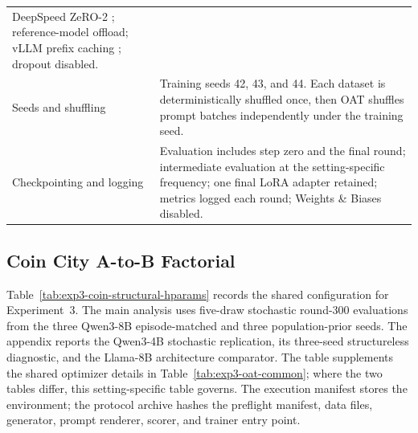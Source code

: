 \begin{center}
\begin{minipage}{\linewidth}
\begin{tabular}{p{.29\linewidth}p{.66\linewidth}}
DeepSpeed ZeRO-2 \citep{rajbhandari2020zero}; reference-model offload; vLLM prefix
caching \citep{kwon2023vllm}; dropout disabled. \\
Seeds and shuffling & Training seeds 42, 43, and 44.  Each dataset is deterministically
shuffled once, then OAT shuffles prompt batches independently under the training seed. \\
Checkpointing and logging & Evaluation includes step zero and the final round;
intermediate evaluation at the setting-specific frequency; one final LoRA adapter retained; metrics
logged each round; Weights \& Biases disabled. \\
\bottomrule
\end{tabular}
\end{minipage}
\end{center}


\subsection{Coin City A-to-B Factorial}
\label{app:exp3-coin-structural-hparams}

Table~\ref{tab:exp3-coin-structural-hparams} records the shared configuration
for Experiment~3. The main analysis uses five-draw stochastic
round-300 evaluations from the three Qwen3-8B episode-matched and three
population-prior seeds. The appendix reports the Qwen3-4B stochastic
replication, its three-seed structureless diagnostic, and the Llama-8B
architecture comparator. The
table supplements the shared optimizer details in Table~\ref{tab:exp3-oat-common}; where the two tables differ, this
setting-specific table governs. The execution manifest stores the environment;
the protocol archive hashes the preflight manifest, data files,
generator, prompt renderer, scorer, and trainer entry point.

